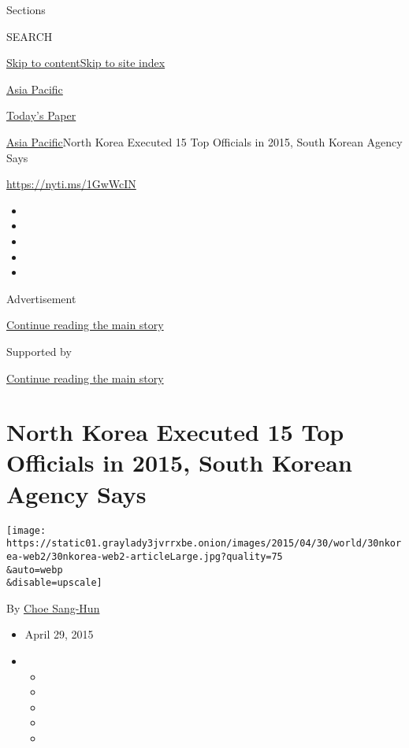 Sections

SEARCH

\protect\hyperlink{site-content}{Skip to
content}\protect\hyperlink{site-index}{Skip to site index}

\href{https://www.nytimes3xbfgragh.onion/section/world/asia}{Asia
Pacific}

\href{https://myaccount.nytimes3xbfgragh.onion/auth/login?response_type=cookie\&client_id=vi}{}

\href{https://www.nytimes3xbfgragh.onion/section/todayspaper}{Today's
Paper}

\href{/section/world/asia}{Asia Pacific}\textbar{}North Korea Executed
15 Top Officials in 2015, South Korean Agency Says

\url{https://nyti.ms/1GwWcIN}

\begin{itemize}
\item
\item
\item
\item
\item
\end{itemize}

Advertisement

\protect\hyperlink{after-top}{Continue reading the main story}

Supported by

\protect\hyperlink{after-sponsor}{Continue reading the main story}

\hypertarget{north-korea-executed-15-top-officials-in-2015-south-korean-agency-says}{%
\section{North Korea Executed 15 Top Officials in 2015, South Korean
Agency
Says}\label{north-korea-executed-15-top-officials-in-2015-south-korean-agency-says}}

\texttt{[image: https://static01.graylady3jvrrxbe.onion/images/2015/04/30/world/30nkorea-web2/30nkorea-web2-articleLarge.jpg?quality=75\\\&auto=webp\\\&disable=upscale]}

By \href{http://www.nytimes3xbfgragh.onion/by/choe-sang-hun}{Choe
Sang-Hun}

\begin{itemize}
\item
  April 29, 2015
\item
  \begin{itemize}
  \item
  \item
  \item
  \item
  \item
  \end{itemize}
\end{itemize}

